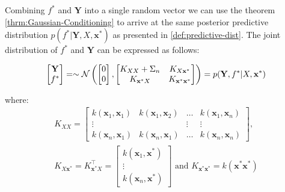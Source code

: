 
%


Combining $f^{\ast}$ and $\mathbf{Y}$ into a single random vector we can use the theorem \ref{thrm:Gaussian-Conditioning}
to arrive at the same posterior predictive distribution
$p(f^{\ast} | \mathbf{Y}, X, \mathbf{x}^{\ast})$ as presented in \ref{def:predictive-dist}.
The joint distribution of $f^{\ast}$ and $\mathbf{Y}$ can be expressed as follows:

\begin{gather}
    \begin{bmatrix}
        \mathbf{Y} \\
        f^{\ast}
    \end{bmatrix} =
    \sim \operatorname{\mathcal{N}} \left(
        \begin{bmatrix}
        0 \\
        0
        \end{bmatrix},
        \begin{bmatrix}
        K_{XX} + \Sigma_n & K_{X\mathbf{x}^{\ast}} \\
        K_{\mathbf{x}^{\ast}X} & K_{\mathbf{x}^{\ast}\mathbf{x}^{\ast}}
        \end{bmatrix}
        \right)
    = p(\mathbf{Y}, f^{\ast}| X, \mathbf{x}^{\ast})
\end{gather}

where:
\begin{gather*}
    K_{XX} =
    \begin{bmatrix}
        k(\mathbf{x}_1, \mathbf{x}_1) & k(\mathbf{x}_1, \mathbf{x}_2) & \dots & k(\mathbf{x}_1, \mathbf{x}_n)\\
        \vdots  &  & \vdots  & \vdots \\
        k(\mathbf{x}_n, \mathbf{x}_1)  & k(\mathbf{x}_n, \mathbf{x}_1) & \dots  & k(\mathbf{x}_n, \mathbf{x}_n)
    \end{bmatrix}, \\
    K_{X\mathbf{x}^{\ast}} = K_{\mathbf{x}^{\ast}X}^{\top} =
    \begin{bmatrix}
        k(\mathbf{x}_1, \mathbf{x}^{\ast}) \\
        \vdots \\
        k(\mathbf{x}_n,  \mathbf{x}^{\ast})
    \end{bmatrix} \text{ and }
    K_{\mathbf{x}^{\ast}\mathbf{x}^{\ast}} = k(\mathbf{x}^{\ast}\mathbf{x}^{\ast})
\end{gather*}

